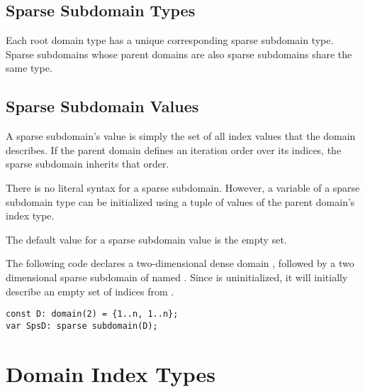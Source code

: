 \subsection{Sparse Subdomain Types}

Each root domain type has a unique corresponding sparse subdomain
type.  Sparse subdomains whose parent domains are also sparse
subdomains share the same type.

\subsection{Sparse Subdomain Values}
\label{Sparse_Domain_Values}

A sparse subdomain's value is simply the set of all index values that
the domain describes.  If the parent domain defines an iteration order
over its indices, the sparse subdomain inherits that order.

There is no literal syntax for a sparse subdomain.  However, a variable of a
sparse subdomain type can be initialized using a tuple of values
of the parent domain's index type.

The default value for a sparse subdomain value is the empty set.

\begin{example}
The following code declares a two-dimensional dense domain ,
followed by a two dimensional sparse subdomain of 
named .  Since  is uninitialized, it will
initially describe an empty set of indices from .
\begin{chapel}
\begin{verbatim}
const D: domain(2) = {1..n, 1..n};
var SpsD: sparse subdomain(D);
\end{verbatim}
\end{chapel}
\end{example}

\section{Domain Index Types}
\label{Index_Types}

